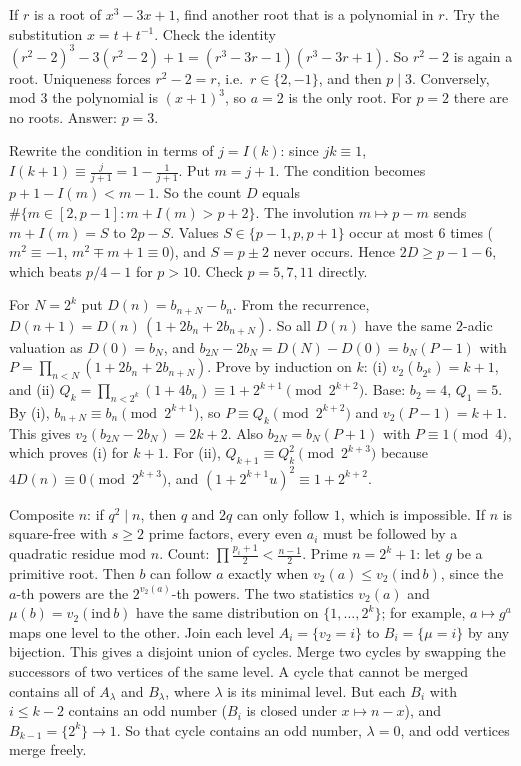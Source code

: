 \documentclass[11pt,a4paper]{article}
\begin{document}

 If $r$ is a root of $x^3-3x+1$, find another root that is a polynomial in $r$. Try the substitution $x=t+t^{-1}$.
 Check the identity $(r^2-2)^3-3(r^2-2)+1=(r^3-3r-1)(r^3-3r+1)$. So $r^2-2$ is again a root.
 Uniqueness forces $r^2-2=r$, i.e.\ $r\in\{2,-1\}$, and then $p\mid 3$. Conversely, mod $3$ the polynomial is $(x+1)^3$, so $a=2$ is the only root. For $p=2$ there are no roots. Answer: $p=3$.

 Rewrite the condition in terms of $j=I(k)$: since $jk\equiv1$, $I(k+1)\equiv\frac{j}{j+1}=1-\frac1{j+1}$.
 Put $m=j+1$. The condition becomes $p+1-I(m)<m-1$. So the count $D$ equals $\#\{m\in[2,p-1]: m+I(m)>p+2\}$.
 The involution $m\mapsto p-m$ sends $m+I(m)=S$ to $2p-S$. Values $S\in\{p-1,p,p+1\}$ occur at most $6$ times ($m^2\equiv-1$, $m^2\mp m+1\equiv0$), and $S=p\pm2$ never occurs. Hence $2D\ge p-1-6$, which beats $p/4-1$ for $p>10$. Check $p=5,7,11$ directly.

 For $N=2^k$ put $D(n)=b_{n+N}-b_n$. From the recurrence, $D(n+1)=D(n)\,(1+2b_n+2b_{n+N})$. So all $D(n)$ have the same $2$-adic valuation as $D(0)=b_N$, and $b_{2N}-2b_N=D(N)-D(0)=b_N(P-1)$ with $P=\prod_{n<N}(1+2b_n+2b_{n+N})$.
 Prove by induction on $k$: (i) $v_2(b_{2^k})=k+1$, and (ii) $Q_k=\prod_{n<2^k}(1+4b_n)\equiv1+2^{k+1}\pmod{2^{k+2}}$. Base: $b_2=4$, $Q_1=5$.
 By (i), $b_{n+N}\equiv b_n\pmod{2^{k+1}}$, so $P\equiv Q_k\pmod{2^{k+2}}$ and $v_2(P-1)=k+1$. This gives $v_2(b_{2N}-2b_N)=2k+2$. Also $b_{2N}=b_N(P+1)$ with $P\equiv1\pmod 4$, which proves (i) for $k+1$. For (ii), $Q_{k+1}\equiv Q_k^2\pmod{2^{k+3}}$ because $4D(n)\equiv0\pmod{2^{k+3}}$, and $(1+2^{k+1}u)^2\equiv1+2^{k+2}$.

 Composite $n$: if $q^2\mid n$, then $q$ and $2q$ can only follow $1$, which is impossible. If $n$ is square-free with $s\ge2$ prime factors, every even $a_i$ must be followed by a quadratic residue mod $n$. Count: $\prod\frac{p_i+1}2<\frac{n-1}2$.
 Prime $n=2^k+1$: let $g$ be a primitive root. Then $b$ can follow $a$ exactly when $v_2(a)\le v_2(\mathrm{ind}\,b)$, since the $a$-th powers are the $2^{v_2(a)}$-th powers. The two statistics $v_2(a)$ and $\mu(b)=v_2(\mathrm{ind}\,b)$ have the same distribution on $\{1,\dots,2^k\}$; for example, $a\mapsto g^a$ maps one level to the other.
 Join each level $A_i=\{v_2=i\}$ to $B_i=\{\mu=i\}$ by any bijection. This gives a disjoint union of cycles. Merge two cycles by swapping the successors of two vertices of the same level. A cycle that cannot be merged contains all of $A_\lambda$ and $B_\lambda$, where $\lambda$ is its minimal level. But each $B_i$ with $i\le k-2$ contains an odd number ($B_i$ is closed under $x\mapsto n-x$), and $B_{k-1}=\{2^k\}\to1$. So that cycle contains an odd number, $\lambda=0$, and odd vertices merge freely.
\end{document}
